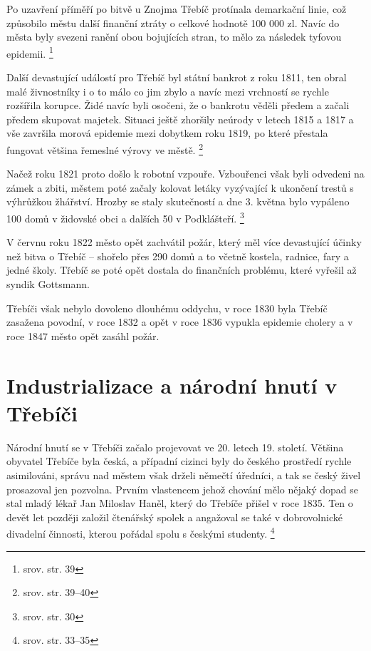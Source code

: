 \documentclass[a4paper,oneside,12pt]{report}
\begin{document}
Po uzavření příměří po bitvě u Znojma Třebíč protínala demarkační linie, což způsobilo městu další finanční ztráty o celkové hodnotě 100 000 zl.
Navíc do města byly svezeni ranění obou bojujících stran, to mělo za následek tyfovou epidemii. \footnote{srov. \cite{Janak1981} str. 39}

Další devastující událostí pro Třebíč byl státní bankrot z roku 1811, ten obral malé živnostníky i o to málo co jim zbylo a navíc mezi vrchností se rychle rozšířila korupce.
Židé navíc byli osočeni, že o bankrotu věděli předem a začali předem skupovat majetek.
Situaci ještě zhoršily neúrody v letech 1815 a 1817 a vše završila morová epidemie mezi dobytkem roku 1819, po které přestala fungovat většina řemeslné výrovy ve městě. \footnote{srov. \cite{Janak1981} str. 39--40}

Načež roku 1821 proto došlo k robotní vzpouře.
Vzbouřenci však byli odvedeni na zámek a zbiti, městem poté začaly kolovat letáky vyzývající k ukončení trestů s výhrůžkou žhářství.
Hrozby se staly skutečností a dne 3. května bylo vypáleno 100 domů v židovské obci a dalších 50 v Podklášteří. \footnote{srov. \cite{Janak1981} str. 30}

V červnu roku 1822 město opět zachvátil požár, který měl více devastující účinky než bitva o Třebíč -- shořelo přes 290 domů a to včetně kostela, radnice, fary a jedné školy.
Třebíč se poté opět dostala do finančních problému, které vyřešil až syndik Gottsmann.

Třebíči však nebylo dovoleno dlouhému oddychu, v roce 1830 byla Třebíč zasažena povodní, v roce 1832 a opět v roce 1836 vypukla epidemie cholery a v roce 1847 město opět zasáhl požár.

\section{Industrializace a národní hnutí v Třebíči}

Národní hnutí se v Třebíči začalo projevovat ve 20. letech 19. století.
Většina obyvatel Třebíče byla česká, a případní cizinci byly do českého prostředí rychle asimilováni, správu nad městem však drželi němečtí úředníci, a tak se český živel prosazoval jen pozvolna.
Prvním vlastencem jehož chování mělo nějaký dopad se stal mladý lékař Jan Miloslav Haněl, který do Třebíče přišel v roce 1835.
Ten o devět let později založil čtenářský spolek a angažoval se také v dobrovolnické divadelní činnosti, kterou pořádal spolu s českými studenty. \footnote{srov. \cite{Janak1981} str. 33--35}
\end{document}
